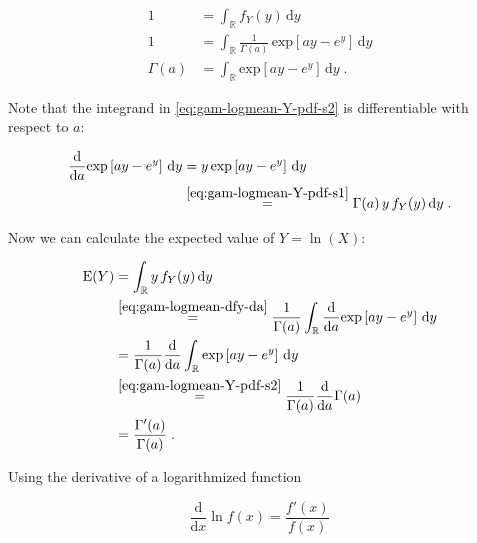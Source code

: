 \documentclass[a4paper,12pt,twoside]{book}
\begin{document}
\begin{equation} \label{eq:gam-logmean-Y-pdf-s2}
\begin{split}
1 &= \int_{\mathbb{R}} f_Y(y) \, \mathrm{d}y \\
1 &= \int_{\mathbb{R}} \frac{1}{\Gamma(a)} \, \mathrm{exp}\left[ ay - e^y \right] \, \mathrm{d}y \\
\Gamma(a) &= \int_{\mathbb{R}} \mathrm{exp}\left[ ay - e^y \right] \, \mathrm{d}y \; .
\end{split}
\end{equation}

Note that the integrand in \eqref{eq:gam-logmean-Y-pdf-s2} is differentiable with respect to $a$:

\begin{equation} \label{eq:gam-logmean-dfy-da}
\begin{split}
\frac{\mathrm{d}}{\mathrm{d}a} \mathrm{exp}\left[ ay - e^y \right] \, \mathrm{d}y &= y \, \mathrm{exp}\left[ ay - e^y \right] \, \mathrm{d}y \\
&\overset{\eqref{eq:gam-logmean-Y-pdf-s1}}{=} \Gamma(a) \, y \, f_Y(y) \, \mathrm{d}y \; .
\end{split}
\end{equation}

Now we can calculate the expected value of $Y = \ln(X)$:

\begin{equation} \label{eq:gam-logmean-E-Y-s1}
\begin{split}
\mathrm{E}(Y) &= \int_{\mathbb{R}} y \, f_Y(y) \, \mathrm{d}y \\
&\overset{\eqref{eq:gam-logmean-dfy-da}}{=} \frac{1}{\Gamma(a)} \int_{\mathbb{R}} \frac{\mathrm{d}}{\mathrm{d}a} \mathrm{exp}\left[ ay - e^y \right] \, \mathrm{d}y \\
&= \frac{1}{\Gamma(a)} \frac{\mathrm{d}}{\mathrm{d}a} \int_{\mathbb{R}} \mathrm{exp}\left[ ay - e^y \right] \, \mathrm{d}y \\
&\overset{\eqref{eq:gam-logmean-Y-pdf-s2}}{=} \frac{1}{\Gamma(a)} \frac{\mathrm{d}}{\mathrm{d}a} \Gamma(a) \\
&= \frac{\Gamma'(a)}{\Gamma(a)} \; .
\end{split}
\end{equation}

Using the derivative of a logarithmized function

\begin{equation} \label{eq:gam-logmean-log-der}
\frac{\mathrm{d}}{\mathrm{d}x} \ln f(x) = \frac{f'(x)}{f(x)}
\end{equation}
\end{document}
